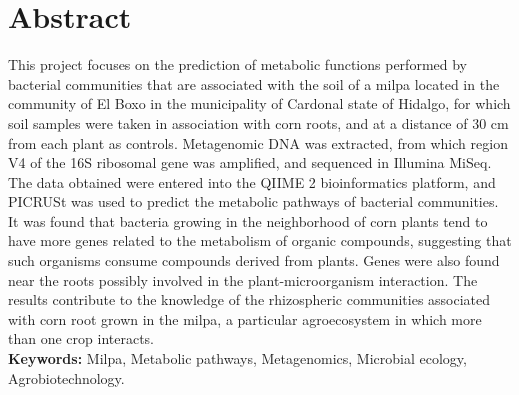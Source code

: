 \documentclass[12pt,letterpaper,oneside]{report}
\begin{document}
\chapter*{Abstract}
This project focuses on the prediction of metabolic functions performed by bacterial communities that are associated with the soil of a milpa located in the community of El Boxo in the municipality of Cardonal state of Hidalgo, for which soil samples were taken in association with corn roots, and at a distance of 30 cm from each plant as controls. Metagenomic DNA was extracted, from which region V4 of the 16S ribosomal gene was amplified, and sequenced in Illumina MiSeq. The data obtained were entered into the QIIME 2 bioinformatics platform, and PICRUSt was used to predict the metabolic pathways of bacterial communities. It was found that bacteria growing in the neighborhood of corn plants tend to have more genes related to the metabolism of organic compounds, suggesting that such organisms consume compounds derived from plants. Genes were also found near the roots possibly involved in the plant-microorganism interaction. The results contribute to the knowledge of the rhizospheric communities associated with corn root grown in the milpa, a particular agroecosystem in which more than one crop interacts.
\\[2cm]
\textbf{Keywords:} Milpa, Metabolic pathways, Metagenomics, Microbial ecology, Agrobiotechnology.
\renewcommand{\contentsname}{Contenido}
\tableofcontents
\cleardoublepage
\listoffigures
{}
\cleardoublepage
\listoftables
{}
\end{document}
